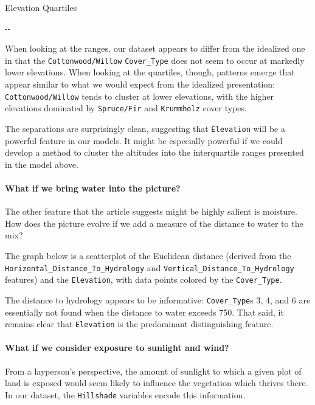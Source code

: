 \documentclass[11pt]{article}
\begin{document}
Elevation Quartiles

\textbar{}-\textbar{}- \textbar{} \textbar{} \textbar{}

    When looking at the ranges, our dataset appears to differ from the
idealized one in that the \texttt{Cottonwood/Willow}
\texttt{Cover\_Type} does not seem to occur at markedly lower
elevations. When looking at the quartiles, though, patterns emerge that
appear similar to what we would expect from the idealized presentation:
\texttt{Cottonwood/Willow} tends to cluster at lower elevations, with
the higher elevations dominated by \texttt{Spruce/Fir} and
\texttt{Krummholz} cover types.

The separations are surprisingly clean, suggesting that
\texttt{Elevation} will be a powerful feature in our models. It might be
especially powerful if we could develop a method to cluster the
altitudes into the interquartile ranges presented in the model above.

    \paragraph{What if we bring water into the
picture?}\label{what-if-we-bring-water-into-the-picture}

The other feature that the article suggests might be highly salient is
moisture. How does the picture evolve if we add a measure of the
distance to water to the mix?

The graph below is a scatterplot of the Euclidean distance (derived from
the \texttt{Horizontal\_Distance\_To\_Hydrology} and
\texttt{Vertical\_Distance\_To\_Hydrology} features) and the
\texttt{Elevation}, with data points colored by the
\texttt{Cover\_Type}.

    

    The distance to hydrology appears to be informative:
\texttt{Cover\_Type}s 3, 4, and 6 are essentially not found when the
distance to water exceeds 750. That said, it remains clear that
\texttt{Elevation} is the predominant distinguishing feature.

\paragraph{What if we consider exposure to sunlight and
wind?}\label{what-if-we-consider-exposure-to-sunlight-and-wind}

From a layperson's perspective, the amount of sunlight to which a given
plot of land is exposed would seem likely to influence the vegetation
which thrives there. In our dataset, the \texttt{Hillshade} variables
encode this information.
\end{document}
